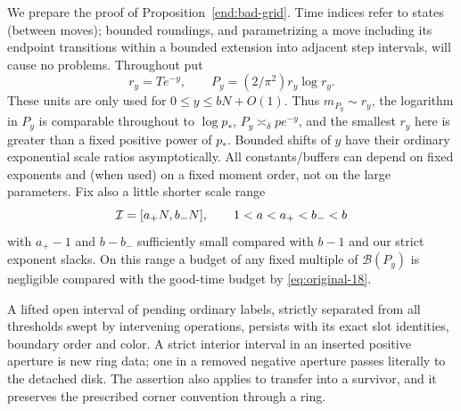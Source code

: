 We prepare the proof of Proposition~\ref{end:bad-grid}. Time indices refer
to states (between moves); bounded roundings, and parametrizing a move including its
endpoint transitions within a bounded extension into adjacent step intervals, will cause
no problems. Throughout put \[
 r_y=T e^{-y},\qquad P_y=(2/\pi^2)r_y\log r_y.
\] These units are only used for \(0\le y\le bN+O(1)\). Thus \(m_{P_y}\sim r_y\), the
logarithm in \(P_y\) is comparable throughout to \(\log p_*\),
\(P_y\asymp_\delta p e^{-y}\), and the smallest \(r_y\) here is greater than a fixed
positive power of \(p_*\). Bounded shifts of \(y\) have their ordinary exponential scale
ratios asymptotically. All constants/buffers can depend on fixed exponents and (when used)
on a fixed moment order, not on the large parameters. Fix also a little shorter scale
range \[
                 {\cal I}=[a_+ N,b_- N],\qquad 1<a<a_+<b_-<b
\] with \(a_+-1\) and \(b-b_-\) sufficiently small compared with \(b-1\) and our strict
exponent slacks. On this range a budget of any fixed multiple of \(\mathcal B(P_y)\) is
negligible compared with the good-time budget by \eqref{eq:original-18}.

\begin{lemma}\label{end:slot-persistence}
A lifted open interval of pending ordinary labels, strictly separated from all
thresholds swept by intervening operations, persists with its exact slot
identities, boundary order and color. A strict interior interval in an inserted
positive aperture is new ring data; one in a removed negative aperture passes
literally to the detached disk. The assertion also applies to transfer into a
survivor, and it preserves the prescribed corner convention through a ring.
\end{lemma}

